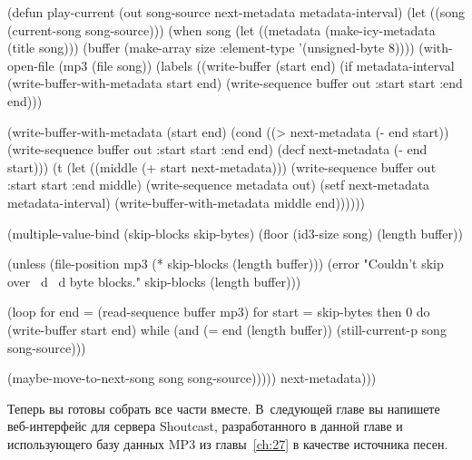 \begin{myverb}
(defun play-current (out song-source next-metadata metadata-interval)
  (let ((song (current-song song-source)))
    (when song
      (let ((metadata (make-icy-metadata (title song)))
            (buffer (make-array size :element-type '(unsigned-byte 8))))
        (with-open-file (mp3 (file song))
          (labels ((write-buffer (start end)
                     (if metadata-interval
                       (write-buffer-with-metadata start end)
                       (write-sequence buffer out :start start :end end)))

                   (write-buffer-with-metadata (start end)
                     (cond
                       ((> next-metadata (- end start))
                        (write-sequence buffer out :start start :end end)
                        (decf next-metadata (- end start)))
                       (t 
                        (let ((middle (+ start next-metadata)))
                          (write-sequence buffer out :start start :end middle)
                          (write-sequence metadata out)
                          (setf next-metadata metadata-interval)
                          (write-buffer-with-metadata middle end))))))

            (multiple-value-bind (skip-blocks skip-bytes)
                (floor (id3-size song) (length buffer))

              (unless (file-position mp3 (* skip-blocks (length buffer)))
                (error "Couldn't skip over ~d ~d byte blocks."
                       skip-blocks (length buffer)))

              (loop for end = (read-sequence buffer mp3) 
                 for start = skip-bytes then 0
                 do (write-buffer start end)
                 while (and (= end (length buffer))
                            (still-current-p song song-source)))

              (maybe-move-to-next-song song song-source)))))
      next-metadata)))
\end{myverb}

Теперь вы готовы собрать все части вместе.  В~следующей главе вы напишете веб-интерфейс
для сервера Shoutcast, разработанного в данной главе и использующего базу данных MP3 из
главы~\ref{ch:27} в качестве источника песен.

